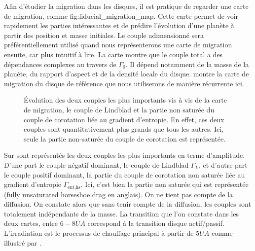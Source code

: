 Afin d'étudier la migration dans les disques, il est pratique de 
regarder une \og carte de migration\fg, comme 
{fig:fiducial_migration_map}. Cette carte permet de voir rapidement 
les parties intéressantes et de prédire l'évolution d'une planète à 
partir des position et masse initiales. Le couple adimensionné 
 sera préférentiellement utilisé quand 
nous représenterons une carte de migration ensuite, car plus intuitif 
à lire. La carte  montre que le couple 
total a des dépendances complexes au travers de $\Gamma_0$. Il 
dépend notamment de la masse de la planète, du rapport d'aspect et 
de la densité locale du disque.  montre la carte de migration du disque de référence que nous utiliserons de manière
récurrente ici. 

\begin{figure}[htbp]
\centering
{}\hfill
{}

\caption{Évolution des deux couples les plus importants vis à vis de la carte de migration, le couple de Lindblad et la partie
non saturée du couple de corotation liée au gradient d'entropie. En effet, ces deux couples sont quantitativement plus grands que
tous les autres. Ici, seule la partie non-saturée du couple de corotation est représentée.}\label{fig:details_maps}
\end{figure}

Sur  sont représentés les deux couples les plus importants en terme d'amplitude. D'une part le couple négatif dominant, le
couple de Lindblad $\Gamma_L$, et d'autre part le couple positif dominant, la partie du couple de corotation non saturée liée au gradient d'entropie
$\Gamma_\text{ent,hs}$. Ici, c'est bien la partie non saturée qui est représentée (fully unsaturated horseshoe drag en anglais). On ne tient pas
compte de la diffusion. On constate alors que sans tenir compte de la diffusion, les couples sont totalement indépendants de la
masse. La transition que l'on constate dans les deux cartes, entre $6-8\unit{UA}$ correspond à la transition disque
actif/passif. L'irradiation est le processus de chauffage principal à partir de $5\unit{UA}$ comme illustré par
.

